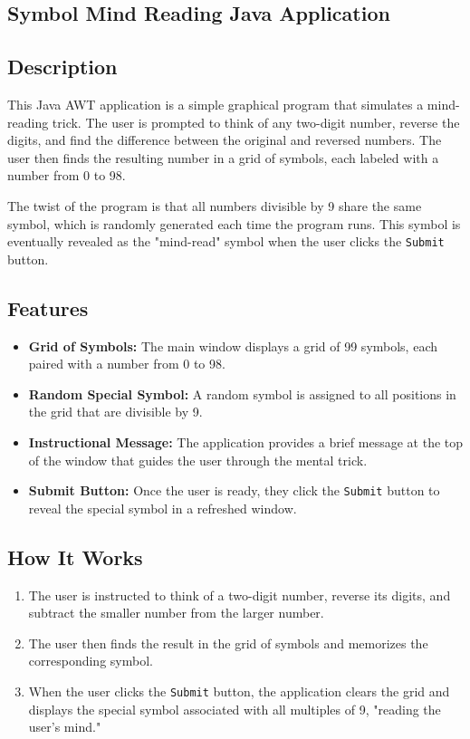 \documentclass[a4paper,15pt]{article}
\begin{document}
\begin{itemize}[leftmargin=1.5cm]
\section{Symbol Mind Reading Java Application}

\subsection{Description}
This Java AWT application is a simple graphical program that simulates a mind-reading trick. The user is prompted to think of any two-digit number, reverse the digits, and find the difference between the original and reversed numbers. The user then finds the resulting number in a grid of symbols, each labeled with a number from 0 to 98.

The twist of the program is that all numbers divisible by 9 share the same symbol, which is randomly generated each time the program runs. This symbol is eventually revealed as the "mind-read" symbol when the user clicks the \texttt{Submit} button.

\subsection{Features}
\begin{itemize}
    \item \textbf{Grid of Symbols:} The main window displays a grid of 99 symbols, each paired with a number from 0 to 98.
    \item \textbf{Random Special Symbol:} A random symbol is assigned to all positions in the grid that are divisible by 9.
    \item \textbf{Instructional Message:} The application provides a brief message at the top of the window that guides the user through the mental trick.
    \item \textbf{Submit Button:} Once the user is ready, they click the \texttt{Submit} button to reveal the special symbol in a refreshed window.
\end{itemize}

\subsection{How It Works}
\begin{enumerate}
    \item The user is instructed to think of a two-digit number, reverse its digits, and subtract the smaller number from the larger number.
    \item The user then finds the result in the grid of symbols and memorizes the corresponding symbol.
    \item When the user clicks the \texttt{Submit} button, the application clears the grid and displays the special symbol associated with all multiples of 9, "reading the user's mind."
\end{enumerate}


\end{itemize}
\end{document}
